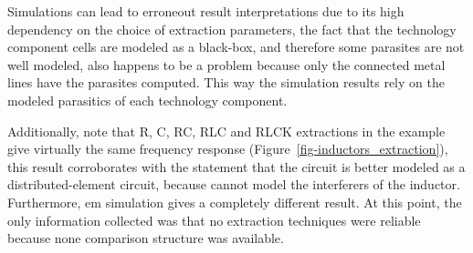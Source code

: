 
Simulations can lead to erroneout result interpretations due to its high dependency on the choice of extraction parameters, the fact that the technology component cells are modeled as a black-box, and therefore some parasites are not well modeled, also happens to be a problem because only the connected metal lines have the parasites computed. This way the simulation results rely on the modeled parasitics of each technology component.


Additionally, note that R, C, RC, RLC and RLCK extractions in the example give virtually the same frequency response (Figure~\ref{fig-inductors_extraction}), this result corroborates with the statement that the circuit is better modeled as a distributed-element circuit, because \assura cannot model the interferers of the inductor. Furthermore, \gls{em} simulation gives a completely different result. At this point, the only information collected was that no extraction techniques were reliable because none comparison structure was available.


